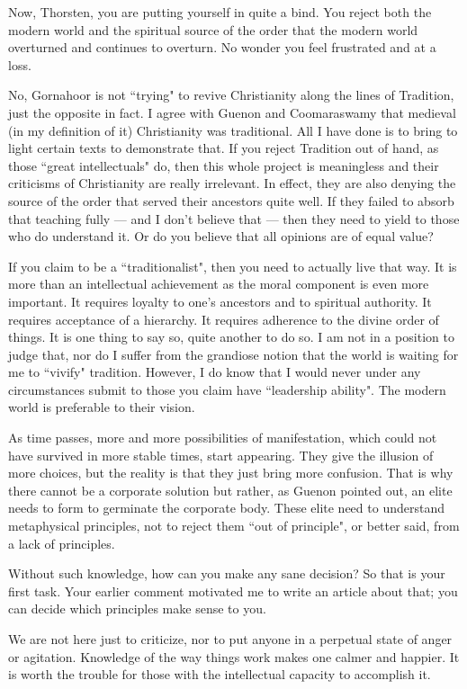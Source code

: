 \begin{footnotesize}
\begin{sffamily}
Now, Thorsten, you are putting yourself in quite a bind. You reject both the modern world and the spiritual source of
the order that the modern world overturned and continues to overturn. No wonder you feel frustrated and at a loss. 

No, Gornahoor is not ``trying" to revive Christianity along the lines of Tradition, just the opposite in fact. I agree
with Guenon and Coomaraswamy that medieval (in my definition of it) Christianity was traditional. All I have done is to
bring to light certain texts to demonstrate that. If you reject Tradition out of hand, as those ``great intellectuals"
do, then this whole project is meaningless and their criticisms of Christianity are really irrelevant. In effect, they
are also denying the source of the order that served their ancestors quite well. If they failed to absorb that teaching
fully — and I don't believe that — then they need to
yield to those who do understand it. Or do you believe that all opinions are of equal value?

If you claim to be a ``traditionalist", then you need to actually live that way. It is more than an intellectual
achievement as the moral component is even more important. It requires loyalty to one's ancestors
and to spiritual authority. It requires acceptance of a hierarchy. It requires adherence to the divine order of things.
It is one thing to say so, quite another to do so. I am not in a position to judge that, nor do I suffer from the
grandiose notion that the world is waiting for me to ``vivify" tradition. However, I do know that I would never under
any circumstances submit to those you claim have ``leadership ability". The modern world is preferable to their vision.

As time passes, more and more possibilities of manifestation, which could not have survived in more stable times, start
appearing. They give the illusion of more choices, but the reality is that they just bring more confusion. That is why
there cannot be a corporate solution but rather, as Guenon pointed out, an elite needs to form to germinate the
corporate body. These elite need to understand metaphysical principles, not to reject them ``out of principle", or
better said, from a lack of principles.

Without such knowledge, how can you make any sane decision? So that is your first task. Your earlier comment motivated
me to write an article about that; you can decide which principles make sense to you.

We are not here just to criticize, nor to put anyone in a perpetual state of anger or agitation. Knowledge of the way
things work makes one calmer and happier. It is worth the trouble for those with the intellectual capacity to
accomplish it.



\end{sffamily}
\end{footnotesize}
